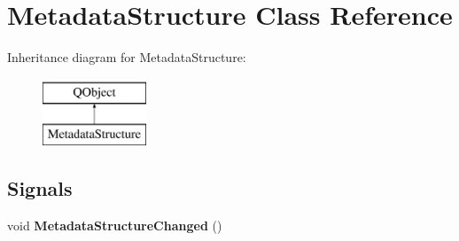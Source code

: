 \hypertarget{class_metadata_structure}{}\section{Metadata\+Structure Class Reference}
\label{class_metadata_structure}
Inheritance diagram for Metadata\+Structure\+:\begin{figure}[H]
\begin{center}
\leavevmode
\includegraphics[height=2.000000cm]{class_metadata_structure}
\end{center}
\end{figure}
\subsection*{Signals}
\begin{DoxyCompactItemize}
\item 
\mbox{\label{class_metadata_structure_aa06e251c2db4f725bab236536b769f16}} 
void {\bfseries Metadata\+Structure\+Changed} ()
\end{DoxyCompactItemize}

